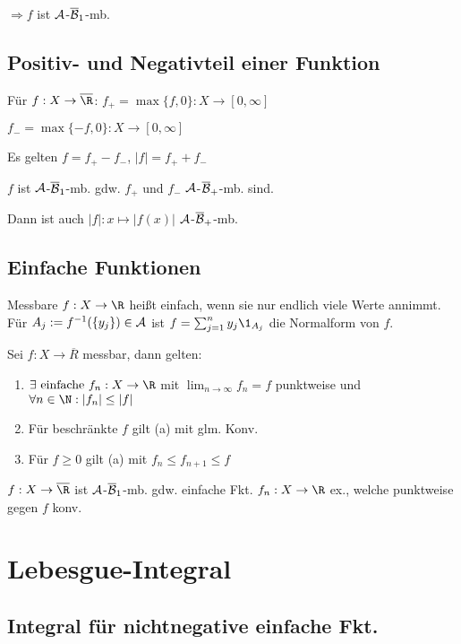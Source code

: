$\Rightarrow f$ ist $\mathcal{A}$-$\overline{\mathcal{B}}_1$-mb.

\subsection*{Positiv- und Negativteil einer Funktion}

Für $f : X \to \overline \R$: $f_+ = \max\{f,0\} : X \to [0, \infty]$

\hspace{20.1mm} $f_- = \max\{-f,0\} : X \to [0, \infty]$

Es gelten $f = f_+ - f_-$, $|f| = f_+ + f_-$

$f$ ist $\mathcal{A}$-$\overline{\mathcal{B}}_1$-mb. gdw. $f_+$ und $f_-$ $\mathcal{A}$-$\overline{\mathcal{B}}_+$-mb. sind.

Dann ist auch $|f| : x \mapsto |f(x)|$ $\mathcal{A}$-$\overline{\mathcal{B}}_+$-mb.

\subsection*{Einfache Funktionen}

Messbare $f : X \to \R$ heißt einfach, wenn sie nur endlich viele Werte annimmt. Für $A_j := f^{-1}(\{y_j\}) \in \mathcal{A}$ ist $f = \sum_{j=1}^n y_j \1_{A_j}$  die Normalform von $f$.

Sei $f : X \to \overline R$ messbar, dann gelten:

\begin{enumerate}[label=(\alph*)]
	\item $\exists \text{ einfache } f_n : X \to \R$ mit $\lim_{n \to \infty} f_n = f$ punktweise und $\forall n \in \N : |f_n| \leq |f|$
	\item Für beschränkte $f$ gilt (a) mit glm. Konv.
	\item Für $f \geq 0$ gilt (a) mit $f_n \leq f_{n+1} \leq f$
\end{enumerate}

$f : X \to \overline\R$ ist $\mathcal{A}$-$\overline{\mathcal{B}}_1$-mb. gdw. einfache Fkt. $f_n : X \to \R$ ex., welche punktweise gegen $f$ konv.

\section*{Lebesgue-Integral}

\subsection*{Integral für nichtnegative einfache Fkt.}

